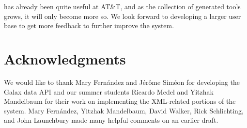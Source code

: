 \documentclass{sig-alternate}
\begin{document}
\pads{} has already been quite useful at AT\&T, and as the collection of generated tools grows, it will only become more so.  We look forward to developing a larger user base to get more feedback to further improve the system. 


\section{Acknowledgments}
We would like to thank Mary Fern\'andez and J\'er\^ome Sim\'eon for 
developing the Galax data API and our summer
students Ricardo Medel and Yitzhak Mandelbaum for their work on implementing
the XML-related portions of the \pads{} system.
Mary Fern\'andez, Yitzhak Mandelbaum, David Walker, Rick Schlichting,
and John Launchbury made many helpful comments on an earlier draft.



\small
 
\end{document}
